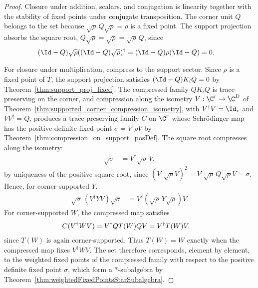 \begin{proof}
    \leanok
    Closure under addition, scalars, and conjugation is linearity together
    with the stability of fixed points under conjugate transposition. The
    corner unit $Q$ belongs to the set because
    $\sqrt{\rho}\,Q\sqrt{\rho}=\rho$ is a fixed point. The support projection
    absorbs the square root, $Q\sqrt{\rho}=\sqrt{\rho}=\sqrt{\rho}\,Q$,
    since
    \begin{align}
        (\Id-Q)\sqrt{\rho}
        ((\Id-Q)\sqrt{\rho})^\dagger
         & =(\Id-Q)\rho(\Id-Q)=0.
        \notag
    \end{align}

    For closure under multiplication, compress to the support sector. Since
    $\rho$ is a fixed point of $T$, the support projection satisfies
    $(\Id-Q)K_iQ=0$ by Theorem~\ref{thm:support_proj_fixed}. The compressed
    family $QK_iQ$ is trace-preserving on the corner, and compression along
    the isometry $V:\C^r\to\C^D$ of
    Theorem~\ref{thm:supported_corner_compression_isometry}, with
    $V^\dagger V=\Id_r$ and $VV^\dagger=Q$, produces a trace-preserving
    family $C$ on $\C^r$ whose Schr\"odinger map has the positive definite
    fixed point $\sigma=V^\dagger\rho V$ by
    Theorem~\ref{thm:compression_on_support_posDef}. The square root
    compresses along the isometry:
    \begin{align}
        \sqrt{\sigma}
         & =V^\dagger\sqrt{\rho}\,V,
        \label{eq:spectral_ds_sqrt_compression}
    \end{align}
    by uniqueness of the positive square root, since
    $(V^\dagger\sqrt{\rho}V)^2
        =V^\dagger\sqrt{\rho}\,Q\sqrt{\rho}V=\sigma$.
    Hence, for corner-supported $Y$,
    \begin{align}
        \sqrt{\sigma}\,(V^\dagger YV)\sqrt{\sigma}
         & =V^\dagger(\sqrt{\rho}\,Y\sqrt{\rho})V.
        \label{eq:spectral_ds_weighted_transport}
    \end{align}
    For corner-supported $W$, the compressed map satisfies
    \begin{align}
        C(V^\dagger WV)
         & =V^\dagger QT(W)QV
        =V^\dagger T(W)V,
        \notag
    \end{align}
    since $T(W)$ is again corner-supported. Thus $T(W)=W$ exactly when the
    compressed map fixes $V^\dagger WV$. The set therefore corresponds,
    element by element, to the weighted fixed points of the compressed
    family with respect to the positive definite fixed point $\sigma$,
    which form a $*$-subalgebra by
    Theorem~\ref{thm:weightedFixedPointsStarSubalgebra}.


\end{proof}
